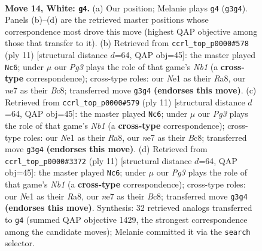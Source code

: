 \documentclass[11pt]{article}
\begin{document}
\clearpage

\begin{figure}[p]\centering
\begin{subfigure}{0.46\textwidth}\centering
\resizebox{\linewidth}{!}{%
\newchessgame
\chessboard[
  setfen={1rb2rk1/ppn1npbp/3q2p1/2p1p3/7P/3PP1P1/PP3PBK/RNBQNR2 w - - 5 14},
  showmover=false,
  pgfstyle=straightmove, color=movearrow, markmove={g3-g4}
]}
\caption{}
\end{subfigure}\hfill
\begin{subfigure}{0.46\textwidth}\centering
\resizebox{\linewidth}{!}{%
\newchessgame
\chessboard[
  setfen={rnbqkb1r/1pp2ppp/p3pn2/8/2pP4/5NP1/PP2PPBP/RNBQ1RK1 b kq - 1 6},
  showmover=false,
  pgfstyle=straightmove, color=movearrow, markmove={b8-c6}
]}
\caption{}
\end{subfigure}
\\[4pt]
\begin{subfigure}{0.46\textwidth}\centering
\resizebox{\linewidth}{!}{%
\newchessgame
\chessboard[
  setfen={rnbqkb1r/1pp2ppp/p3pn2/8/2pP4/5NP1/PP2PPBP/RNBQ1RK1 b kq - 1 6},
  showmover=false,
  pgfstyle=straightmove, color=movearrow, markmove={b8-c6}
]}
\caption{}
\end{subfigure}\hfill
\begin{subfigure}{0.46\textwidth}\centering
\resizebox{\linewidth}{!}{%
\newchessgame
\chessboard[
  setfen={rnbqkb1r/1pp2ppp/p3pn2/8/2pP4/5NP1/PP2PPBP/RNBQ1RK1 b kq - 1 6},
  showmover=false,
  pgfstyle=straightmove, color=movearrow, markmove={b8-c6}
]}
\caption{}
\end{subfigure}
\caption{\textbf{Move 14, White: \texttt{g4}.} (a) Our position; Melanie plays \texttt{g4} (\texttt{g3g4}). Panels (b)--(d) are the retrieved master positions whose correspondence most drove this move (highest QAP objective among those that transfer to it). (b) Retrieved from \texttt{ccrl\_top\_p0000\#578} (ply 11) [structural distance $d$=64, QAP obj=45]: the master played \texttt{Nc6}; under $\mu$ our \emph{Pg3} plays the role of that game's \emph{Nb1} (a \textbf{cross-type} correspondence); cross-type roles: our \emph{N}e1 as their \emph{R}a8, our \emph{n}e7 as their \emph{B}c8; transferred move \texttt{g3g4} \textbf{(endorses this move)}. (c) Retrieved from \texttt{ccrl\_top\_p0000\#579} (ply 11) [structural distance $d$=64, QAP obj=45]: the master played \texttt{Nc6}; under $\mu$ our \emph{Pg3} plays the role of that game's \emph{Nb1} (a \textbf{cross-type} correspondence); cross-type roles: our \emph{N}e1 as their \emph{R}a8, our \emph{n}e7 as their \emph{B}c8; transferred move \texttt{g3g4} \textbf{(endorses this move)}. (d) Retrieved from \texttt{ccrl\_top\_p0000\#3372} (ply 11) [structural distance $d$=64, QAP obj=45]: the master played \texttt{Nc6}; under $\mu$ our \emph{Pg3} plays the role of that game's \emph{Nb1} (a \textbf{cross-type} correspondence); cross-type roles: our \emph{N}e1 as their \emph{R}a8, our \emph{n}e7 as their \emph{B}c8; transferred move \texttt{g3g4} \textbf{(endorses this move)}. Synthesis: 32 retrieved analogs transferred to \texttt{g4} (summed QAP objective 1429, the strongest correspondence among the candidate moves); Melanie committed it via the \texttt{search} selector.}
\label{fig:thought-m26}
\end{figure}
\end{document}

